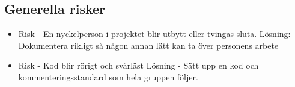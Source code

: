 \subsection{Generella risker}
\begin{itemize}
\item Risk - En nyckelperson i projektet blir utbytt eller tvingas sluta.
Lösning: Dokumentera rikligt så någon annan lätt kan ta över personens arbete
\item Risk - Kod blir rörigt och svårläst
Lösning - Sätt upp en kod och kommenteringsstandard som hela gruppen följer.
\end{itemize}



